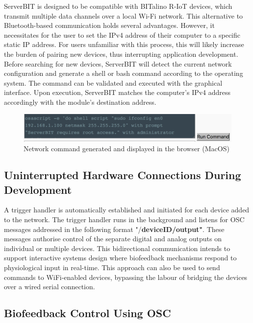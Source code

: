 ServerBIT is designed to be compatible with BITalino R-IoT devices, which transmit multiple data channels over a local Wi-Fi network. This alternative to Bluetooth-based communication holds several advantages. However, it necessitates for the user to set the IPv4 address of their computer to a specific static IP address. For users unfamiliar with this process, this will likely increase the burden of pairing new devices, thus interrupting application development. Before searching for new devices, ServerBIT will detect the current network configuration and generate a shell or bash command according to the operating system. The command can be validated and executed with the graphical interface. Upon execution, ServerBIT matches the computer's IPv4 address accordingly with the module's destination address.

\begin{figure}[ht]
    \centering
    \includegraphics[width=\textwidth]{Chapters/Figures/technical/ServerBIT/ipv4_cmd_osx.png}
    \caption{Network command generated and displayed in the browser (MacOS)}
    \label{fig:cmd_osx}
\end{figure}

\subsection{Uninterrupted Hardware Connections During Development}

A trigger handler is automatically established and initiated for each device added to the network. The trigger handler runs in the background and listens for OSC messages addressed in the following format "/\textbf{deviceID/output"}. These messages authorise control of the separate digital and analog outputs on individual or multiple devices. This bidirectional communication intends to support interactive systems design where biofeedback mechanisms respond to physiological input in real-time. This approach can also be used to send commands to WiFi-enabled devices, bypassing the labour of bridging the devices over a wired serial connection.

\subsection{Biofeedback Control Using OSC} \label{Biofeedback}

